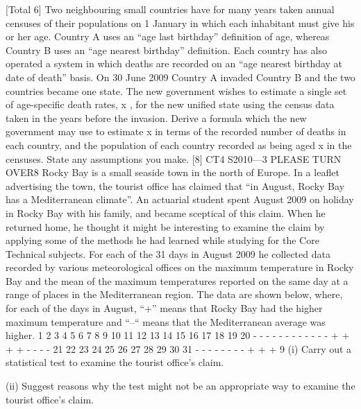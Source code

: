 \documentclass[a4paper,12pt]{article}
\begin{document}
\begin{enumerate}

[Total 6]
Two neighbouring small countries have for many years taken annual censuses of their
populations on 1 January in which each inhabitant must give his or her age. Country
A uses an “age last birthday” definition of age, whereas Country B uses an “age
nearest birthday” definition. Each country has also operated a system in which deaths
are recorded on an “age nearest birthday at date of death” basis.
On 30 June 2009 Country A invaded Country B and the two countries became one
state. The new government wishes to estimate a single set of age-specific death rates,
\mu x , for the new unified state using the census data taken in the years before the
invasion.
Derive a formula which the new government may use to estimate \mu x in terms of the
recorded number of deaths in each country, and the population of each country
recorded as being aged x in the censuses. State any assumptions you make.
[8]
CT4 S2010—3
PLEASE TURN OVER8
Rocky Bay is a small seaside town in the north of Europe. In a leaflet advertising the
town, the tourist office has claimed that “in August, Rocky Bay has a Mediterranean
climate”. An actuarial student spent August 2009 on holiday in Rocky Bay with his
family, and became sceptical of this claim. When he returned home, he thought it
might be interesting to examine the claim by applying some of the methods he had
learned while studying for the Core Technical subjects. For each of the 31 days in
August 2009 he collected data recorded by various meteorological offices on the
maximum temperature in Rocky Bay and the mean of the maximum temperatures
reported on the same day at a range of places in the Mediterranean region.
The data are shown below, where, for each of the days in August, “+” means that
Rocky Bay had the higher maximum temperature and “–“ means that the
Mediterranean average was higher.
1 2 3 4 5 6 7 8 9 10 11 12 13 14 15 16 17 18 19 20
- - - - - - - - - - - - + + + + - - - -
21 22 23 24 25 26 27 28 29 30 31
- - - - - - - - + + +
9
(i) Carry out a statistical test to examine the tourist office’s claim.

(ii) Suggest reasons why the test might not be an appropriate way to examine the
tourist office’s claim.




\end{enumerate}
\end{document}

